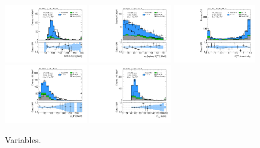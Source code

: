 \begin{figure}[tp]
  \includegraphics[width=0.32\textwidth]{figures/vbf-LTT/mMMC}
  \includegraphics[width=0.32\textwidth]{figures/vbf-LTT/mT}
  \includegraphics[width=0.32\textwidth]{figures/vbf-LTT/met-phi-centrality}
  \includegraphics[width=0.32\textwidth]{figures/vbf-LTT/H-pt-hi}
  \includegraphics[width=0.32\textwidth]{figures/vbf-LTT/mvis}
  \caption{Variables.}
  \label{fig:prospects-ltt-taus}
\end{figure}

